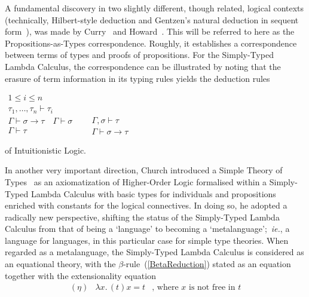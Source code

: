 \documentclass[11pt,twocolumn]{article}
\newcommand{\ie}{\emph{ie.}}
\begin{document}
A fundamental discovery in two slightly different, though related, logical
contexts (technically, Hilbert-style deduction %
and Gentzen's natural deduction in sequent form~\cite{Gentzen1935}), was made
by Curry~\cite{Curry1934} and Howard~\cite{Howard1969}.  This will be
referred to here as the 
Propositions-as-Types correspondence. %
Roughly, it establishes a correspondence between terms of types and proofs
of propositions.  For the Simply-Typed Lambda Calculus, the correspondence
can be illustrated by noting that the erasure of term information in its
typing rules yields the deduction rules
  \begin{center}
  $\begin{array}{c}
    1\leq i\leq n
    \\ \hline
    \tau_1,\ldots,\tau_n\vdash \tau_i
  \end{array}$
  \\[2mm]
  $\begin{array}{c}
    \Gamma\vdash \sigma\to\tau
    \quad 
    \Gamma\vdash\sigma 
    \\ \hline
    \Gamma\vdash\tau
  \end{array}
  \enspace\quad
  \begin{array}{c}
    \Gamma,\sigma\vdash\tau
    \\ \hline
    \Gamma\vdash\sigma\to\tau
  \end{array}$
\end{center}
of Intuitionistic %
Logic. %

In another very important direction, Church introduced a Simple Theory of
Types~\cite{Church1940} as an axiomatization of Higher-Order Logic
formalised within a Simply-Typed Lambda Calculus with basic types
for individuals and propositions enriched with constants for the logical
connectives.  In doing so, he adopted a radically new perspective,
shifting the status of the Simply-Typed Lambda Calculus from that of being
a `language' to becoming a `metalanguage';~\ie, a language for languages,
in this particular case for simple type theories.  When regarded as a
metalanguage, the Simply-Typed Lambda Calculus is considered as an
equational theory, with the \mbox{$\beta$-rule}~(\ref{BetaReduction})
stated as an equation together with the extensionality equation
\[\begin{array}{rll}
(\eta) & \lambda x.\,(t)x = t 
& \mbox{, where $x$ is not free in $t$}
  \end{array}\]
\end{document}
